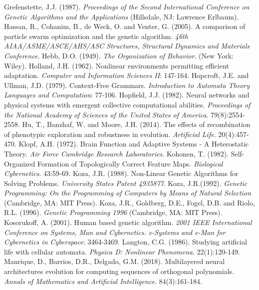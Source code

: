 \documentclass[spanish,a4paper,12pt,twoside]{report}
\begin{document}
\begin{thebibliography}{00}
   Grefenstette, J.J. (1987). \emph{Proceedings of the Second International Conference on Genetic Algorithms and the Applications} (Hillsdale, NJ: Lawrence Erlbaum).
   Hassan, R., Cohanim, B., de Weck, O. and Venter, G. (2005). A comparison of particle swarm optimization and the genetic algorithm. \emph{46th AIAA/ASME/ASCE/AHS/ASC Structures, Structural Dynamics and Materials Conference}.
   Hebb, D.O. (1949). \emph{The Organization of Behavior}. (New York: Wiley).
   Holland, J.H. (1962). Nonlinear environments permitting efficient adaptation. \emph{Computer and Information Sciences II}: 147-164.
   Hopcroft, J.E. and Ullman, J.D. (1979). Context-Free Grammars. \emph{Introduction to Automata Theory Languages and Computation}: 77-106.
   Hopfield, J.J. (1982). Neural networks and physical systems with emergent collective computational abilities. \emph{Proceedings of the National Academy of Sciences of the United States of America}. 79(8):2554-2558.
   Hu, T., Banzhaf, W. and Moore, J.H. (2014). The effects of recombination of phenotypic exploration and robustness in evolution. \emph{Artificial Life}. 20(4):457-470.
   Klopf, A.H. (1972). Brain Function and Adaptive Systems - A Heterostatic Theory. \emph{Air Force Cambridge Research Laboratories}.
   Kohonen, T. (1982). Self-Organized Formation of Topologically Correct Feature Maps. \emph{Biological Cybernetics}. 43:59-69.
   Koza, J.R. (1988). Non-Linear Genetic Algorithms for Solving Problems. \emph{University States Patent 4935877}.
   Koza, J.R.(1992). \emph{Genetic Programming: On the Programming of Computers by Means of Natural Selection}  (Cambridge, MA: MIT Press).
   Koza, J.R., Goldberg, D.E., Fogel, D.B. and Riolo, R.L. (1996). \emph{Genetic Programming 1996} (Cambridge, MA: MIT Press).
   Kosorukoff, A. (2001). Human based genetic algorithm. \emph{2001 IEEE International Conference on Systems, Man and Cybernetics. e-Systems and e-Man for Cybernetics in Cyberspace}: 3464-3469.
   Langton, C.G. (1986). Studying artificial life with cellular automata. \emph{Physica D: Nonlinear Phenomena}. 22(1):120-149.
   Manrique, D., Barrios, D.R., Delgado, G.M. (2018). Multilayered neural architectures evolution for computing sequences of orthogonal polynomials. \emph{Annals of Mathematics and Artificial Intelligence}. 84(3):161-184.

\end{thebibliography}
\end{document}
